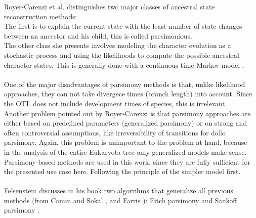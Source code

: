   
    Royer-Carenzi et al. distinguishes two major classes of ancestral state reconstruction methods: \\
    The first is to explain the current state with the least number of state changes between an 
      ancestor and his child, this is called parsimonious. \\
    The other class she presents involves modeling the character evolution as a stochastic process and 
      using the likelihoods to compute the possible ancestral character states. This is generally done 
      with a continuous time Markov model \cite{RoyerCarenzi2013}. \\
     \\

    One of the major disadvantages of parsimony methods is that, unlike likelihood approaches, they 
      can not take divergece times (branch length) into account. Since the OTL does not include 
      development times of species, this is irrelevant. \\
    Another problem pointed out by Royer-Carenzi is that parsimony approaches are either based on 
      predefined parameters (generalized parsimony) or on strong and often controversial assumptions, 
      like irreversibility of transitions for dollo parsimony. Again, this problem is unimportant to 
      the problem at hand, because in the analysis of the entire Eukaryota tree only generalized 
      models make sense. \\

    Parsimony-based methods are used in this work, since they are fully sufficient for the presented 
      use case here. Following the principle of the simpler model first. \\
     \\
    Felsenstein \cite{Felsenstein2003} discusses in his book two algorithms that generalize all 
      previous methods (from Camin and Sokal \cite{Camin1965},  and Farris 
      \cite{Farris1970}): Fitch parsimony \cite{Fitch1971} and Sankoff parsimony \cite{Sankoff1975}. \\
     \\
     \\
    
